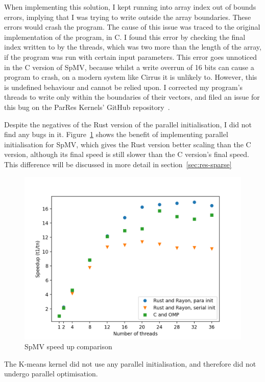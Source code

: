 When implementing this solution, I kept running into array index out of bounds errors, implying that I was trying to write outside the array boundaries. These errors would crash the program. The cause of this issue was traced to the original implementation of the program, in C. I found this error by checking the final index written to by the threads, which was two more than the length of the array, if the program was run with certain input parameters. This error goes unnoticed in the C version of SpMV, because whilst a write overrun of 16 bits can cause a program to crash, on a modern system like Cirrus it is unlikely to. However, this is undefined behaviour and cannot be relied upon. I corrected my program's threads to write only within the boundaries of their vectors, and filed an issue for this bug on the ParRes Kernels' GitHub repository~\cite{SparseBug}.

Despite the negatives of the Rust version of the parallel initialisation, I did not find any bugs in it. Figure~\ref{fig:sparse-speedup} shows the benefit of implementing parallel initialisation for SpMV, which gives the Rust version better scaling than the C version, although its final speed is still slower than the C version's final speed. This difference will be discussed in more detail in section~\ref{sec:res-sparse}

\begin{figure}[H]
    \centering
    \includegraphics[width=.8\linewidth]{figs/sparse/speedup.png}
    \caption{SpMV speed up comparison}
    \label{fig:sparse-speedup}
\end{figure}

The K-means kernel did not use any parallel initialisation, and therefore did not undergo parallel optimisation.
